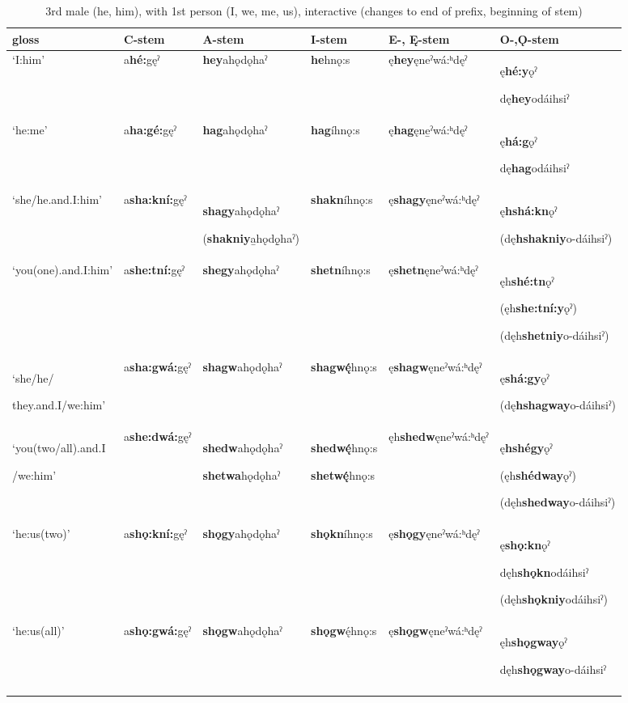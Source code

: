 \begin{table}
\caption{3rd male (he, him), with 1st person (I, we, me, us), interactive (changes to end of prefix, beginning of stem)}
\label{tab:1:3m1pron2}
\tiny{
\begin{tabularx}{\textwidth}{XXXXXX}
\lsptoprule
gloss & C-stem & A-stem & I-stem & E-, Ę{}-stem & O-,Ǫ{}-stem\\
\midrule
‘I:him’ & a\textbf{hé:}gęˀ & \textbf{hey}ahǫdǫhaˀ & \textbf{he}hnǫ:s & ę\textbf{hey}ęneˀwá:ʰdęˀ & ę\textbf{hé:y}ǫˀ

dę\textbf{hey}odáihsiˀ\\
‘he:me’ & a\textbf{ha:gé:}gęˀ & \textbf{hag}ahǫdǫhaˀ & \textbf{hag}íhnǫ:s & ę\textbf{hag}ęne̱ˀwá:ʰdęˀ & ę\textbf{há:g}ǫˀ

dę\textbf{hag}odáihsiˀ\\
‘she/he.and.I:him’ & a\textbf{sha:kní:}gęˀ & \textbf{shagy}ahǫdǫhaˀ

(\textbf{shakniy}a̱hǫdǫ̱haˀ) & \textbf{shakn}íhnǫ:s & ę\textbf{shagy}ęneˀwá:ʰdęˀ & ę\textbf{hshá:kn}ǫˀ

(dę\textbf{hshakniy}o-dáihsiˀ)\\
‘you(one).and.I:him’ & a\textbf{she:tní:}gęˀ & \textbf{shegy}ahǫdǫhaˀ & \textbf{shetn}íhnǫ:s & ę\textbf{shetn}ęneˀwá:ʰdęˀ & ęh\textbf{shé:tn}ǫˀ 

(ęh\textbf{she:tní:y}ǫˀ)

(dęh\textbf{shetniy}o-dáihsiˀ)\\
‘she/he/

they.and.I/we:him’ & a\textbf{sha:gwá:}gęˀ & \textbf{shagw}ahǫdǫhaˀ & \textbf{shagw\'{ę}}hnǫ:s & ę\textbf{shagw}ęneˀwá:ʰdęˀ & ę\textbf{shá:gy}ǫˀ

(dę\textbf{hshagway}o-dáihsiˀ)\\
‘you(two/all).and.I

/we:him’ & a\textbf{she:dwá:}gęˀ & \textbf{shedw}ahǫdǫhaˀ

\textbf{shetwa}hǫdǫhaˀ & \textbf{shedw\'{ę}}hnǫ:s

\textbf{shetw\'{ę}}hnǫ:s & ęh\textbf{shedw}ęneˀwá:ʰdęˀ & ę\textbf{hshégy}ǫˀ

(ęh\textbf{shédway}ǫˀ)

(dęh\textbf{shedway}o-dáihsiˀ)\\
‘he:us(two)’ & a\textbf{shǫ:kní:}gęˀ & \textbf{shǫgy}ahǫdǫhaˀ & \textbf{shǫkn}íhnǫ:s & ę\textbf{shǫgy}ęneˀwá:ʰdęˀ & ę\textbf{shǫ:kn}ǫˀ

dęh\textbf{shǫkn}odáihsiˀ

(dęh\textbf{shǫkniy}odáihsiˀ)\\
‘he:us(all)’ & a\textbf{shǫ:gwá:}gęˀ & \textbf{shǫgw}ahǫdǫhaˀ & \textbf{shǫgw}\'{ę}hnǫ:s & ę\textbf{shǫgw}ęneˀwá:ʰdęˀ & ęh\textbf{shǫgway}ǫˀ

dęh\textbf{shǫgway}o-dáihsiˀ\\
\lspbottomrule
\end{tabularx}}
\end{table}


